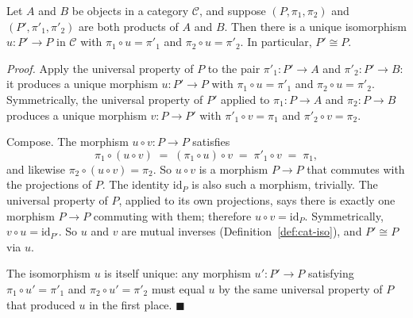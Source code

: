 \begin{proposition}\label{prop:product-unique}
Let $A$ and $B$ be objects in a category $\mathcal{C}$, and suppose
$(P, \pi_1, \pi_2)$ and $(P', \pi'_1, \pi'_2)$ are both products of $A$
and $B$. Then there is a unique isomorphism $u : P' \to P$ in
$\mathcal{C}$ with $\pi_1 \circ u = \pi'_1$ and
$\pi_2 \circ u = \pi'_2$. In particular, $P' \cong P$.

\begin{center}
\end{center}

\noindent \textit{Proof.} Apply the universal property of $P$ to the pair
$\pi'_1 : P' \to A$ and $\pi'_2 : P' \to B$: it produces a unique morphism
$u : P' \to P$ with $\pi_1 \circ u = \pi'_1$ and $\pi_2 \circ u = \pi'_2$.
Symmetrically, the universal property of $P'$ applied to
$\pi_1 : P \to A$ and $\pi_2 : P \to B$ produces a unique morphism
$v : P \to P'$ with $\pi'_1 \circ v = \pi_1$ and $\pi'_2 \circ v = \pi_2$.

Compose. The morphism $u \circ v : P \to P$ satisfies
\[ \pi_1 \circ (u \circ v) \; = \; (\pi_1 \circ u) \circ v \; = \;
   \pi'_1 \circ v \; = \; \pi_1, \]
and likewise $\pi_2 \circ (u \circ v) = \pi_2$. So $u \circ v$ is a
morphism $P \to P$ that commutes with the projections of $P$. The
identity $\mathrm{id}_P$ is also such a morphism, trivially. The
universal property of $P$, applied to its own projections, says there
is exactly one morphism $P \to P$ commuting with them; therefore
$u \circ v = \mathrm{id}_P$. Symmetrically,
$v \circ u = \mathrm{id}_{P'}$. So $u$ and $v$ are mutual inverses
(Definition~\ref{def:cat-iso}), and $P' \cong P$ via $u$.

The isomorphism $u$ is itself unique: any morphism $u' : P' \to P$
satisfying $\pi_1 \circ u' = \pi'_1$ and $\pi_2 \circ u' = \pi'_2$ must
equal $u$ by the same universal property of $P$ that produced $u$ in
the first place. $\blacksquare$
\end{proposition}

